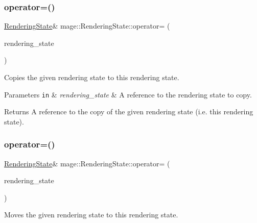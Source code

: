 \subsubsection{\texorpdfstring{operator=()}{operator=()}\hspace{0.1cm}{\footnotesize\ttfamily [1/2]}}
{\footnotesize\ttfamily \hyperlink{structmage_1_1_rendering_state}{Rendering\+State}\& mage\+::\+Rendering\+State\+::operator= (\begin{DoxyParamCaption}\item[{const \hyperlink{structmage_1_1_rendering_state}{Rendering\+State} \&}]{rendering\+\_\+state }\end{DoxyParamCaption})\hspace{0.3cm}{\ttfamily [delete]}}

Copies the given rendering state to this rendering state.


\begin{DoxyParams}[1]{Parameters}
\mbox{\tt in}  & {\em rendering\+\_\+state} & A reference to the rendering state to copy. \\
\hline
\end{DoxyParams}
\begin{DoxyReturn}{Returns}
A reference to the copy of the given rendering state (i.\+e. this rendering state). 
\end{DoxyReturn}
\hypertarget{structmage_1_1_rendering_state_ad16e9963683b1eda6cbe675b8b210368}{}\label{structmage_1_1_rendering_state_ad16e9963683b1eda6cbe675b8b210368} 
\subsubsection{\texorpdfstring{operator=()}{operator=()}\hspace{0.1cm}{\footnotesize\ttfamily [2/2]}}
{\footnotesize\ttfamily \hyperlink{structmage_1_1_rendering_state}{Rendering\+State}\& mage\+::\+Rendering\+State\+::operator= (\begin{DoxyParamCaption}\item[{\hyperlink{structmage_1_1_rendering_state}{Rendering\+State} \&\&}]{rendering\+\_\+state }\end{DoxyParamCaption})\hspace{0.3cm}{\ttfamily [delete]}}

Moves the given rendering state to this rendering state.



